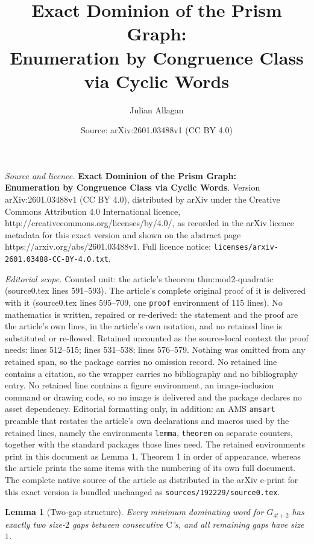 \documentclass[10pt,a4paper]{amsart}
\title{\textbf{Exact Dominion of the Prism Graph:\\ Enumeration by Congruence Class via Cyclic Words}}
\author{Julian Allagan}
\date{Source: arXiv:2601.03488v1 (CC BY 4.0)}
\newtheorem{lemma}{Lemma}
\newcommand{\colC}{\mathrm{C}}
\begin{document}
\maketitle

\noindent\emph{Source and licence.} \textbf{Exact Dominion of the Prism Graph:\\ Enumeration by Congruence Class via Cyclic Words}. Version arXiv:2601.03488v1 (CC BY 4.0), distributed by arXiv under the Creative Commons Attribution 4.0 International licence, http://creativecommons.org/licenses/by/4.0/, as recorded in the arXiv licence metadata for this exact version and shown on the abstract page https://arxiv.org/abs/2601.03488v1. Full licence notice: \texttt{licenses/arxiv-2601.03488-CC-BY-4.0.txt}.\par\smallskip

\noindent\textit{Editorial scope.} Counted unit: the article's theorem thm:mod2-quadratic (source0.tex lines 591--593). The article's complete original proof of it is delivered with it (source0.tex lines 595--709, one \texttt{proof} environment of 115 lines). No mathematics is written, repaired or re-derived: the statement and the proof are the article's own lines, in the article's own notation, and no retained line is substituted or re-flowed.  Retained uncounted as the source-local context the proof needs: lines 512--515; lines 531--538; lines 576--579.  Nothing was omitted from any retained span, so the package carries no omission record.  No retained line contains a citation, so the wrapper carries no bibliography and no bibliography entry.  No retained line contains a figure environment, an image-inclusion command or drawing code, so no image is delivered and the package declares no asset dependency.  Editorial formatting only, in addition: an AMS \texttt{amsart} preamble that restates the article's own declarations and macros used by the retained lines, namely the environments \texttt{lemma}, \texttt{theorem} on separate counters, together with the standard packages those lines need.  The retained environments print in this document as Lemma 1, Theorem 1 in order of appearance, whereas the article prints the same items with the numbering of its own full document.  The complete native source of the article as distributed in the arXiv e-print for this exact version is bundled unchanged as \texttt{sources/192229/source0.tex}.
\begin{lemma}[Two-gap structure]\label{lem:mod2-two-gap}
Every minimum dominating word for $G_{4t+2}$ has exactly two size-$2$ gaps between
consecutive $\colC$'s, and all remaining gaps have size $1$.
\end{lemma}
\end{document}
